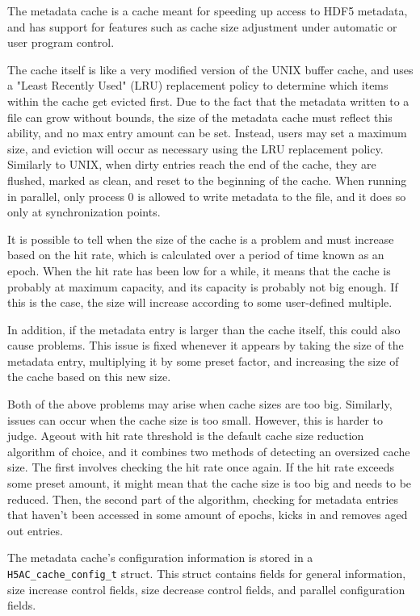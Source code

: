 
The metadata cache is a cache meant for speeding up access to HDF5 metadata, and has support for features such as cache size adjustment under automatic or user program control. 

The cache itself is like a very modified version of the UNIX buffer cache, and uses a "Least Recently Used" (LRU) replacement policy to determine which items within the cache get evicted first. Due to the fact that the metadata written to a file can grow without bounds, the size of the metadata cache must reflect this ability, and no max entry amount can be set. Instead, users may set a maximum size, and eviction will occur as necessary using the LRU replacement policy. Similarly to UNIX, when dirty entries reach the end of the cache, they are flushed, marked as clean, and reset to the beginning of the cache. When running in parallel, only process 0 is allowed to write metadata to the file, and it does so only at synchronization points.

It is possible to tell when the size of the cache is a problem and must increase based on the hit rate, which is calculated over a period of time known as an epoch. When the hit rate has been low for a while, it means that the cache is probably at maximum capacity, and its capacity is probably not big enough. If this is the case, the size will increase according to some user-defined multiple. 

In addition, if the metadata entry is larger than the cache itself, this could also cause problems. This issue is fixed whenever it appears by taking the size of the metadata entry, multiplying it by some preset factor, and increasing the size of the cache based on this new size. 

Both of the above problems may arise when cache sizes are too big. Similarly, issues can occur when the cache size is too small. However, this is harder to judge. Ageout with hit rate threshold is the default cache size reduction algorithm of choice, and it combines two methods of detecting an oversized cache size. The first involves checking the hit rate once again. If the hit rate exceeds some preset amount, it might mean that the cache size is too big and needs to be reduced. Then, the second part of the algorithm, checking for metadata entries that haven't been accessed in some amount of epochs, kicks in and removes aged out entries. 

The metadata cache's configuration information is stored in a \texttt{H5AC\_cache\_config\_t} struct. This struct contains fields for general information, size increase control fields, size decrease control fields, and parallel configuration fields. 

